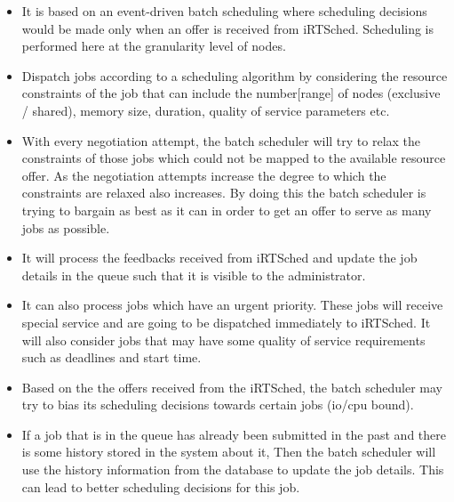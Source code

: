 \begin{itemize}
\item It is based on an event-driven batch scheduling where scheduling decisions would be made only when an offer is received from iRTSched. Scheduling is performed here at the granularity level of nodes.
\item Dispatch jobs according to a scheduling algorithm by considering the resource constraints of the job that can include the number[range] of nodes (exclusive / shared), memory size, duration, quality of service parameters etc.
\item With every negotiation attempt, the batch scheduler will try to relax the constraints of those jobs which could not be mapped to the available resource offer. As the negotiation attempts increase the degree to which the constraints are relaxed also increases. By doing this the batch scheduler is trying to bargain as best as it can in order to get an offer to serve as many jobs as possible.
\item It will process the feedbacks received from iRTSched and update the job details in the queue such that it is visible to the administrator.
\item It can also process jobs which have an urgent priority. These jobs will receive special service and are going to be dispatched immediately to iRTSched. It will also consider jobs that may have some quality of service requirements such as deadlines and start time.
\item Based on the the offers received from the iRTSched, the batch scheduler may try to bias its scheduling decisions towards certain jobs (io/cpu bound).
\item If a job that is in the queue has already been submitted in the past and there is some history stored in the system about it, Then the batch scheduler will use the history information from the database to update the job details. This can lead to better scheduling decisions for this job.
\end{itemize}
